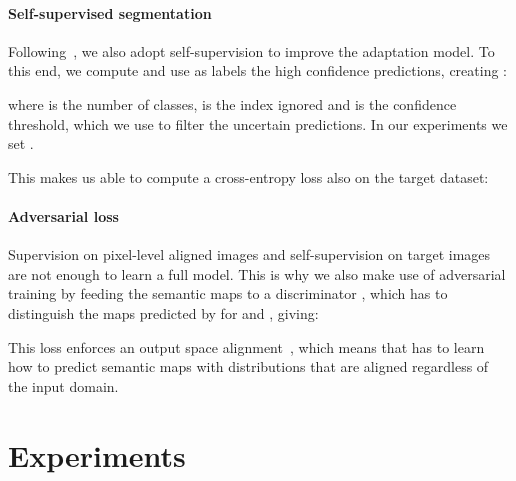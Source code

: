 \documentclass{bmvc2k}
\begin{document}
\paragraph{Self-supervised segmentation}
Following~\cite{bdl}, we also adopt self-supervision to improve the adaptation model. To this end, we compute  and use as labels the high confidence predictions, creating :



where  is the number of classes,  is the index ignored and  is the confidence threshold, which we use to filter the uncertain predictions. In our experiments we set .

This makes us able to compute a cross-entropy loss also on the target dataset:



\paragraph{Adversarial loss}
Supervision on pixel-level aligned images and self-supervision on target images are not enough to learn a full model. This is why we also make use of adversarial training by feeding the semantic maps to a discriminator , which has to distinguish the maps predicted by  for  and , giving:



This loss enforces an output space alignment~\cite{adaptsegnet}, which means that  has to learn how to predict semantic maps with distributions that are aligned regardless of the input domain.

\section{Experiments}
\end{document}
